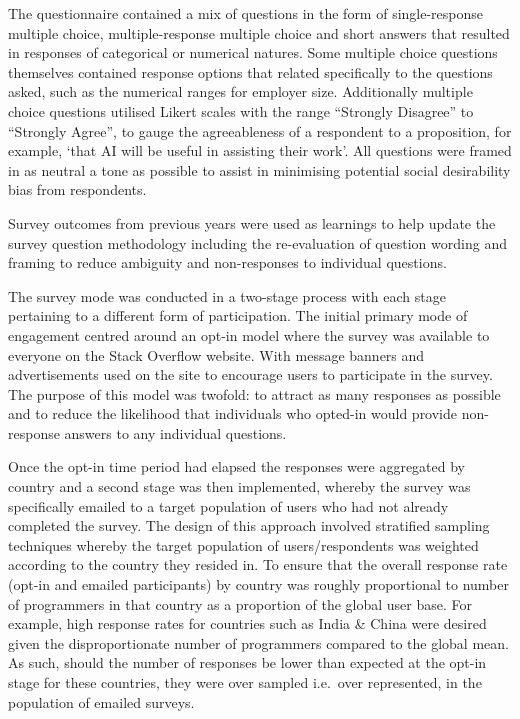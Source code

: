 \documentclass[
  12pt,
]{article}
\begin{document}
The questionnaire contained a mix of questions in the form of
single-response multiple choice, multiple-response multiple choice and
short answers that resulted in responses of categorical or numerical
natures. Some multiple choice questions themselves contained response
options that related specifically to the questions asked, such as the
numerical ranges for employer size. Additionally multiple choice
questions utilised Likert scales with the range ``Strongly Disagree'' to
``Strongly Agree'', to gauge the agreeableness of a respondent to a
proposition, for example, `that AI will be useful in assisting their
work'. All questions were framed in as neutral a tone as possible to
assist in minimising potential social desirability bias from
respondents. \newline

Survey outcomes from previous years were used as learnings to help
update the survey question methodology including the re-evaluation of
question wording and framing to reduce ambiguity and non-responses to
individual questions. \newline

The survey mode was conducted in a two-stage process with each stage
pertaining to a different form of participation. The initial primary
mode of engagement centred around an opt-in model where the survey was
available to everyone on the Stack Overflow website. With message
banners and advertisements used on the site to encourage users to
participate in the survey. The purpose of this model was twofold: to
attract as many responses as possible and to reduce the likelihood that
individuals who opted-in would provide non-response answers to any
individual questions. \newline

Once the opt-in time period had elapsed the responses were aggregated by
country and a second stage was then implemented, whereby the survey was
specifically emailed to a target population of users who had not already
completed the survey. The design of this approach involved stratified
sampling techniques whereby the target population of users/respondents
was weighted according to the country they resided in. To ensure that
the overall response rate (opt-in and emailed participants) by country
was roughly proportional to number of programmers in that country as a
proportion of the global user base. For example, high response rates for
countries such as India \& China were desired given the disproportionate
number of programmers compared to the global mean. As such, should the
number of responses be lower than expected at the opt-in stage for these
countries, they were over sampled i.e.~over represented, in the
population of emailed surveys. \newline \newline \newline
\end{document}
